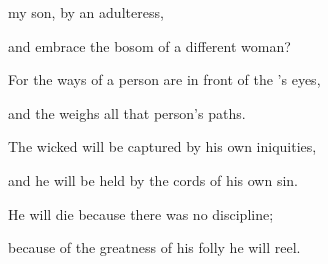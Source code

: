 {my son,
by an adulteress,
\par }{\Q and embrace
the bosom
of a
different woman?
\par }{\Q {}For
the ways
of a person
are in front
of the
{}’s
eyes,
\par }{\Q and the
{}
weighs
all
that person’s paths.
\par }{\Q {}The
wicked
will be captured
by his own iniquities,
\par }{\Q and he will be held
by the cords
of his own sin.
\par }{\Q {}He
will die
because
there was no
discipline;
\par }{\Q because
of the greatness
of his folly
he will reel.


\par }
